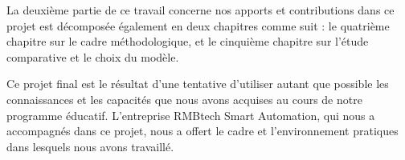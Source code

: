 La deuxième partie de ce travail concerne nos apports et contributions dans ce projet est décomposée également en deux chapitres comme suit : le quatrième chapitre sur le cadre méthodologique, et le cinquième  chapitre sur l’étude comparative et le choix du modèle.

Ce projet final est le résultat d'une tentative d'utiliser autant que possible les connaissances et les capacités que nous avons acquises au cours de notre programme éducatif. L'entreprise RMBtech Smart Automation, qui nous a accompagnés dans ce projet, nous a offert le cadre et l'environnement pratiques dans lesquels nous avons travaillé.
